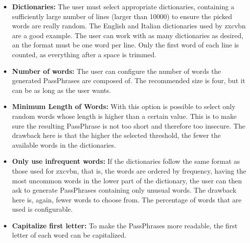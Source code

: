 \begin{itemize}
\setlength\itemsep{-3pt}

\item \textbf{Dictionaries: }The user must select appropriate dictionaries, containing a sufficiently large number of lines (larger than 10000) to ensure the picked words are really random. The English and Italian dictionaries used by zxcvbn are a good example. The user can work with as many dictionaries as desired, an the format must be one word per line. Only the first word of each line is counted, as everything after a space is trimmed.

\item \textbf{Number of words: }The user can configure the number of words the generated PassPhrases are composed of. The recommended size is four, but it can be as long as the user wants.

\item \textbf{Minimum Length of Words: }With this option is possible to select only random words whose length is higher than a certain value. This is to make sure the resulting PassPhrase is not too short and therefore too insecure. The drawback here is that the higher the selected threshold, the fewer the available words in the dictionaries.

\item \textbf{Only use infrequent words: }If the dictionaries follow the same format as those used for zxcvbn, that is, the words are ordered by frequency, having the most uncommon words in the lower part of the dictionary, the user can then ask to generate PassPhrases containing only unusual words. The drawback here is, again, fewer words to choose from. The percentage of words that are used is configurable.

\item \textbf{Capitalize first letter: }To make the PassPhrases more readable, the first letter of each word can be capitalized.
\end{itemize}